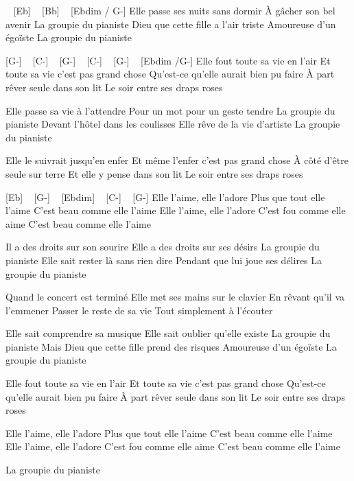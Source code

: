 
\begin{guitar}
[G-] ~ [Eb] ~ [Bb] ~ [Ebdim / G-]
	 Elle passe ses nuits sans dormir
À gâcher son bel avenir
La groupie du pianiste
Dieu que cette fille a l'air triste
Amoureuse d'un égoïste
La groupie du pianiste

[G-] ~ [C-] ~ [G-] ~ [C-] ~ [G-] ~ [Ebdim /G-]
Elle fout toute sa vie en l'air
Et toute sa vie c'est pas grand chose
Qu'est-ce qu'elle aurait bien pu faire
À part rêver seule dans son lit
Le soir entre ses draps roses

Elle passe sa vie à l'attendre
Pour un mot pour un geste tendre
La groupie du pianiste
Devant l'hôtel dans les coulisses
Elle rêve de la vie d'artiste
La groupie du pianiste

Elle le suivrait jusqu'en enfer
Et même l'enfer c'est pas grand chose
À côté d'être seule sur terre
Et elle y pense dans son lit
Le soir entre ses draps roses

[Eb] ~ [G-] ~ [Ebdim] ~ [C-] ~ [G-]
Elle l'aime, elle l'adore
Plus que tout elle l'aime
C'est beau comme elle l'aime
Elle l'aime, elle l'adore
C'est fou comme elle aime
C'est beau comme elle l'aime

Il a des droits sur son sourire
Elle a des droits sur ses désirs
La groupie du pianiste
Elle sait rester là sans rien dire
Pendant que lui joue ses délires
La groupie du pianiste

Quand le concert est terminé
Elle met ses mains sur le clavier
En rêvant qu'il va l'emmener
Passer le reste de sa vie
Tout simplement à l'écouter

Elle sait comprendre sa musique
Elle sait oublier qu'elle existe
La groupie du pianiste
Mais Dieu que cette fille prend des risques
Amoureuse d'un égoïste
La groupie du pianiste

Elle fout toute sa vie en l'air
Et toute sa vie c'est pas grand chose
Qu'est-ce qu'elle aurait bien pu faire
À part rêver seule dans son lit
Le soir entre ses draps roses

Elle l'aime, elle l'adore
Plus que tout elle l'aime
C'est beau comme elle l'aime
Elle l'aime, elle l'adore
C'est fou comme elle aime
C'est beau comme elle l'aime

La groupie du pianiste
\end{guitar}